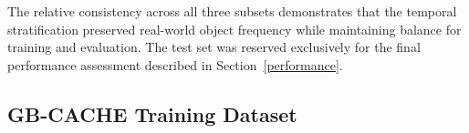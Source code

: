 \documentclass[../main.tex]{subfiles}
\begin{document}
\noindent The relative consistency across all three subsets demonstrates that the temporal stratification preserved real-world object frequency while maintaining balance for training and evaluation. 
The test set was reserved exclusively for the final performance assessment described in Section~\ref{performance}.

\subsection{GB-CACHE Training Dataset}
\label{sec:gbcache_training_data}





\end{document}
